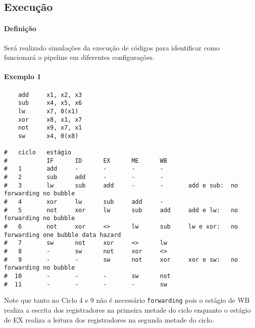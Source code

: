 \documentclass{article}
\begin{document}
\subsection{Execução}
\paragraph{Definição}Será realizado simulações da execução de códigos para identificar como funcionará o pipeline em diferentes configurações.
\paragraph{Exemplo 1}
\begin{scriptsize}
    \myStyleRISCV
    \begin{lstlisting}
    add     x1, x2, x3
    sub     x4, x5, x6
    lw      x7, 0(x1)
    xor     x8, x1, x7
    not     x9, x7, x1
    sw      x4, 0(x8)

#   ciclo   estágio
#           IF      ID      EX      ME      WB  
#   1       add     -       -       -       -   
#   2       sub     add     -       -       -   
#   3       lw      sub     add     -       -       add e sub:  no forwarding no bubble
#   4       xor     lw      sub     add     -   
#   5       not     xor     lw      sub     add     add e lw:   no forwarding no bubble
#   6       not     xor     <>      lw      sub     lw e xor:   no forwarding one bubble data hazard
#   7       sw      not     xor     <>      lw  
#   8       -       sw      not     xor     <>  
#   9       -       -       sw      not     xor     xor e sw:   no forwarding no bubble
#  10       -       -       -       sw      not 
#  11       -       -       -       -       sw  
    \end{lstlisting}
\end{scriptsize}
Note que tanto no Ciclo 4 e 9 não é necessário \texttt{forwarding} pois o estágio de WB realiza a escrita dos registradores na primeira metade do ciclo enquanto o estágio de EX realiza a leitura dos registradores na segunda metade do ciclo.
\end{document}
